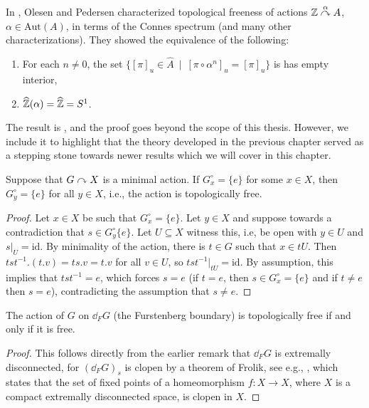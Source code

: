 \begin{remark}
	In \cite{olesenpedersen3}, Olesen and Pedersen characterized topological freeness of actions $\mathbb{Z} \stackrel{\alpha}{\curvearrowright} A$, $\alpha \in \mathrm{Aut}(A)$, in terms of the Connes spectrum (and many other characterizations). They showed the equivalence of the following:
	\begin{enumerate}[nosep]
		\item For each $n \neq 0$, the set $\{ [\pi]_u \in \hat A \ \mid \ [\pi \circ \alpha^{n}]_u = [\pi]_u\}$ is has empty interior,
		\item $\widehat{\mathbb{Z}}(\alpha) = \widehat{\mathbb{Z}} = S^1$.
	\end{enumerate}
	The result is \cite[Theorem 10.4]{olesenpedersen3}, and the proof goes beyond the scope of this thesis. However, we include it to highlight that the theory developed in the previous chapter served as a stepping stone towards newer results which we will cover in this chapter.
\end{remark}
\begin{lemma}
	Suppose that $G \stackrel{}{\curvearrowright} X$ is a minimal action. If $G_x^\circ = \{e\}$ for some $x \in X$, then $G_y^\circ = \{e\}$ for all $y \in X$, i.e., the action is topologically free.
	\label{topfreeminimal}
\end{lemma}
\begin{proof}
	Let $x \in X$ be such that $G_x^\circ = \{e\}$. Let $y \in X$ and suppose towards a contradiction that $s \in G_y^\circ\{e\}$. Let $U \subseteq X$ witness this, i.e, be open with $y \in U$ and $s|_U=\mathrm{id}$. By minimality of the action, there is $t \in G$ such that $x \in tU$. Then $tst^{-1}.(t.v) =  ts.v = t.v$ for all $v \in U$, so $tst^{-1}|_{tU}=  \mathrm{id}$. By assumption, this implies that $tst^{-1} = e$, which forces $s = e$ (if $t = e$, then $s \in G_x^\circ = \{e\}$ and if $t \neq e$ then $s = e$), contradicting the assumption that $s \neq e$. 
\end{proof}
\begin{corollary}
	The action of $G$ on $\dd_F G$ (the Furstenberg boundary) is topologically free if and only if it is free.
\end{corollary}
\begin{proof}
	This follows directly from the earlier remark that $\dd_F G$ is extremally disconnected, for $(\dd_F G)_s$ is clopen by a theorem of Frolik, see e.g., \cite[Theorem 3.1]{frolik1971maps}, which states that the set of fixed points of a homeomorphism $f \colon X \to X$, where $X$ is a compact extremally disconnected space, is clopen in $X$.
\end{proof}
